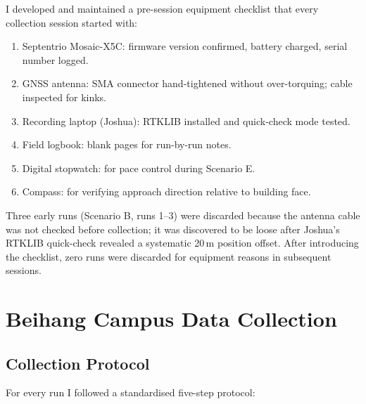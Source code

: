 \documentclass[12pt,a4paper]{article}
\begin{document}
I developed and maintained a pre-session equipment checklist that every collection
session started with:

\begin{enumerate}
  \item Septentrio Mosaic-X5C: firmware version confirmed, battery charged, serial number
    logged.
  \item GNSS antenna: SMA connector hand-tightened without over-torquing;
    cable inspected for kinks.
  \item Recording laptop (Joshua): RTKLIB installed and quick-check mode tested.
  \item Field logbook: blank pages for run-by-run notes.
  \item Digital stopwatch: for pace control during Scenario E.
  \item Compass: for verifying approach direction relative to building face.
\end{enumerate}

Three early runs (Scenario B, runs 1--3) were discarded because the antenna cable was
not checked before collection; it was discovered to be loose after Joshua's RTKLIB
quick-check revealed a systematic 20\,m position offset.
After introducing the checklist, zero runs were discarded for equipment reasons in
subsequent sessions.

\section{Beihang Campus Data Collection}

\subsection{Collection Protocol}

For every run I followed a standardised five-step protocol:
\end{document}
